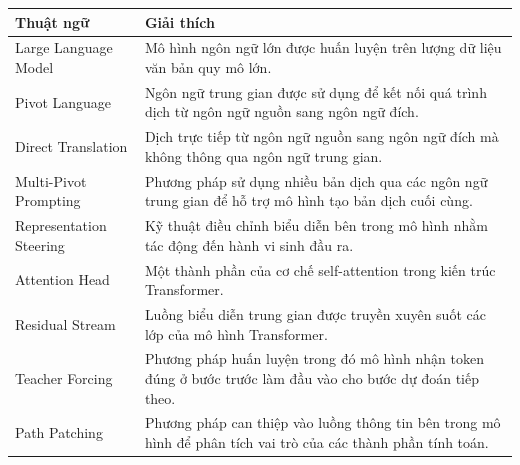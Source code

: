 \renewcommand{\arraystretch}{1.3}

\begin{longtable}{|p{5cm}|p{9cm}|}
\hline
\textbf{Thuật ngữ} & \textbf{Giải thích} \\
\hline
Large Language Model & Mô hình ngôn ngữ lớn được huấn luyện trên lượng dữ liệu văn bản quy mô lớn. \\
\hline
Pivot Language & Ngôn ngữ trung gian được sử dụng để kết nối quá trình dịch từ ngôn ngữ nguồn sang ngôn ngữ đích. \\
\hline
Direct Translation & Dịch trực tiếp từ ngôn ngữ nguồn sang ngôn ngữ đích mà không thông qua ngôn ngữ trung gian. \\
\hline
Multi-Pivot Prompting & Phương pháp sử dụng nhiều bản dịch qua các ngôn ngữ trung gian để hỗ trợ mô hình tạo bản dịch cuối cùng. \\
\hline
Representation Steering & Kỹ thuật điều chỉnh biểu diễn bên trong mô hình nhằm tác động đến hành vi sinh đầu ra. \\
\hline
Attention Head & Một thành phần của cơ chế self-attention trong kiến trúc Transformer. \\
\hline
Residual Stream & Luồng biểu diễn trung gian được truyền xuyên suốt các lớp của mô hình Transformer. \\
\hline
Teacher Forcing & Phương pháp huấn luyện trong đó mô hình nhận token đúng ở bước trước làm đầu vào cho bước dự đoán tiếp theo. \\
\hline
Path Patching & Phương pháp can thiệp vào luồng thông tin bên trong mô hình để phân tích vai trò của các thành phần tính toán. \\
\hline
\end{longtable}

